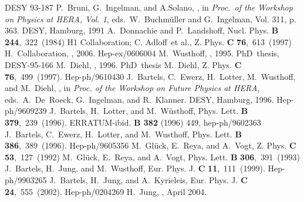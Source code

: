 \documentclass[10pt]{article} \usepackage{dina4}
\begin{document}
\begin{mcbibliography}{10}
\newblock \mbox{DESY} 93-187\relax
\relax
{}
P.~Bruni, G.~Ingelman, and A.Solano,
,
\newblock in {\em Proc.\ of the Workshop on Physics at HERA, Vol. 1},
  eds.~W.~Buchm\"uller and G.~Ingelman, Vol. 311, p. 363.
\newblock \mbox{DESY}, Hamburg, 1991\relax
\relax
{}
A.~Donnachie and P.~Landshoff,
\newblock Nucl. Phys. {\bf B}{} {\bf 244},~322~(1984)\relax
\relax
{}
\mbox{H1} Collaboration; C. Adloff~et al.,
\newblock Z. Phys. {\bf C}{} {\bf 76},~613~(1997)\relax
\relax
{}
H.~Collaboration,
, 2006.
\newblock Hep-ex/0606004\relax
\relax
{}
M.~Wusthoff,
,
  1995.
\newblock \mbox{PhD thesis}, \mbox{DESY-95-166}\relax
\relax
{}
M.~Diehl,
, 1996.
\newblock \mbox{PhD thesis}\relax
\relax
{}
M.~Diehl,
\newblock Z. Phys. {\bf C}{} {\bf 76},~499~(1997).
\newblock Hep-ph/9610430\relax
\relax
{}
J.~Bartels, C.~Ewerz, H.~Lotter, M.~Wusthoff, and M.~Diehl,
,
\newblock in {\em Proc. of the Workshop on Future Physics at HERA},
  eds.~A.~\mbox{De Roeck}, G.~Ingelman, and R.~Klanner.
\newblock \mbox{DESY}, Hamburg, 1996.
\newblock Hep-ph/9609239\relax
\relax
{}
J.~Bartels, H.~Lotter, and M.~W\"usthoff,
\newblock Phys. Lett. {\bf B}{} {\bf 379},~239~(1996).
\newblock \mbox{ERRATUM}-ibid. {\bf B 382} (1996) 449, hep-ph/9602363\relax
\relax
{}
J.~Bartels, C.~Ewerz, H.~Lotter, and M.~Wusthoff,
\newblock Phys. Lett. {\bf B}{} {\bf 386},~389~(1996).
\newblock Hep-ph/9605356\relax
\relax
{}
M.~Gl\"uck, E.~Reya, and A.~Vogt,
\newblock Z. Phys. {\bf C}{} {\bf 53},~127~(1992)\relax
\relax
{}
M.~Gl\"uck, E.~Reya, and A.~Vogt,
\newblock Phys. Lett. {\bf B}{} {\bf 306},~391~(1993)\relax
\relax
{}
J.~Bartels, H.~Jung, and M.~Wusthoff,
\newblock Eur. Phys. J. {\bf C}{} {\bf 11},~111~(1999).
\newblock Hep-ph/9903265\relax
\relax
{}
J.~Bartels, H.~Jung, and A.~Kyrieleis,
\newblock Eur. Phys. J. {\bf C}{} {\bf 24},~555~(2002).
\newblock Hep-ph/0204269\relax
\relax
{}
H.~Jung,
, April 2004.

\end{mcbibliography}
\end{document}
